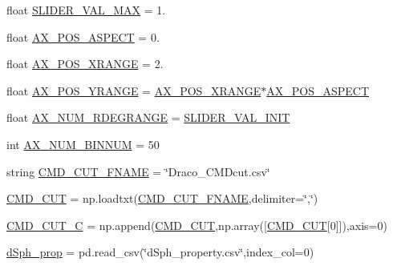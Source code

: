 \begin{DoxyCompactItemize}
\item 
float \hyperlink{namespaceplot__Draco__SDSS__CMD__CMcut_ad39261f3e28c13131eb72d456f3d7233}{S\+L\+I\+D\+E\+R\+\_\+\+V\+A\+L\+\_\+\+M\+AX} = 1.
\item 
float \hyperlink{namespaceplot__Draco__SDSS__CMD__CMcut_ae15a2c2c3ffa4a3b84fc0f5656839de6}{A\+X\+\_\+\+P\+O\+S\+\_\+\+A\+S\+P\+E\+CT} = 0.
\item 
float \hyperlink{namespaceplot__Draco__SDSS__CMD__CMcut_a980cf9f485285e0f42012816f166d695}{A\+X\+\_\+\+P\+O\+S\+\_\+\+X\+R\+A\+N\+GE} = 2.
\item 
float \hyperlink{namespaceplot__Draco__SDSS__CMD__CMcut_a1e8de288a2718587ab6719166ba9959d}{A\+X\+\_\+\+P\+O\+S\+\_\+\+Y\+R\+A\+N\+GE} = \hyperlink{namespaceplot__Draco__SDSS__CMD__CMcut_a980cf9f485285e0f42012816f166d695}{A\+X\+\_\+\+P\+O\+S\+\_\+\+X\+R\+A\+N\+GE}$\ast$\hyperlink{namespaceplot__Draco__SDSS__CMD__CMcut_ae15a2c2c3ffa4a3b84fc0f5656839de6}{A\+X\+\_\+\+P\+O\+S\+\_\+\+A\+S\+P\+E\+CT}
\item 
float \hyperlink{namespaceplot__Draco__SDSS__CMD__CMcut_a0b36091b75b5333bcb2c2b33b515d6e9}{A\+X\+\_\+\+N\+U\+M\+\_\+\+R\+D\+E\+G\+R\+A\+N\+GE} = \hyperlink{namespaceplot__Draco__SDSS__CMD__CMcut_a47a66344d34ddb1e3eadf4fcb3d12021}{S\+L\+I\+D\+E\+R\+\_\+\+V\+A\+L\+\_\+\+I\+N\+IT}
\item 
int \hyperlink{namespaceplot__Draco__SDSS__CMD__CMcut_a3042e57611aacbef7dc04e6cc299a2e8}{A\+X\+\_\+\+N\+U\+M\+\_\+\+B\+I\+N\+N\+UM} = 50
\item 
string \hyperlink{namespaceplot__Draco__SDSS__CMD__CMcut_ad9714a5ae3a136dd47e695a2fafaf2b3}{C\+M\+D\+\_\+\+C\+U\+T\+\_\+\+F\+N\+A\+ME} = \char`\"{}Draco\+\_\+\+C\+M\+Dcut.\+csv\char`\"{}
\item 
\hyperlink{namespaceplot__Draco__SDSS__CMD__CMcut_aa017d84d6f3e9260ccc0bcb5eac49fed}{C\+M\+D\+\_\+\+C\+UT} = np.\+loadtxt(\hyperlink{namespaceplot__Draco__SDSS__CMD__CMcut_ad9714a5ae3a136dd47e695a2fafaf2b3}{C\+M\+D\+\_\+\+C\+U\+T\+\_\+\+F\+N\+A\+ME},delimiter=\char`\"{},\char`\"{})
\item 
\hyperlink{namespaceplot__Draco__SDSS__CMD__CMcut_ab37f89f8fe675c4ab0757fb4a4182a6f}{C\+M\+D\+\_\+\+C\+U\+T\+\_\+C} = np.\+append(\hyperlink{namespaceplot__Draco__SDSS__CMD__CMcut_aa017d84d6f3e9260ccc0bcb5eac49fed}{C\+M\+D\+\_\+\+C\+UT},np.\+array(\mbox{[}\hyperlink{namespaceplot__Draco__SDSS__CMD__CMcut_aa017d84d6f3e9260ccc0bcb5eac49fed}{C\+M\+D\+\_\+\+C\+UT}\mbox{[}0\mbox{]}\mbox{]}),axis=0)
\item 
\hyperlink{namespaceplot__Draco__SDSS__CMD__CMcut_a4cbc86f5f7ecbe01c903e19da60d0f29}{d\+Sph\+\_\+prop} = pd.\+read\+\_\+csv(\char`\"{}d\+Sph\+\_\+property.\+csv\char`\"{},index\+\_\+col=0)

\end{DoxyCompactItemize}
